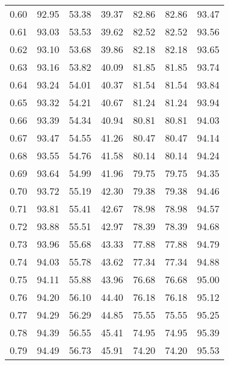 \begin{tabular}{|c|c|c|c|c|c|c|}
      0.60 &     92.95 &     53.38 &      39.37 &   82.86 &      82.86 &         93.47 \\
      0.61 &     93.03 &     53.53 &      39.62 &   82.52 &      82.52 &         93.56 \\
      0.62 &     93.10 &     53.68 &      39.86 &   82.18 &      82.18 &         93.65 \\
      0.63 &     93.16 &     53.82 &      40.09 &   81.85 &      81.85 &         93.74 \\
      0.64 &     93.24 &     54.01 &      40.37 &   81.54 &      81.54 &         93.84 \\
      0.65 &     93.32 &     54.21 &      40.67 &   81.24 &      81.24 &         93.94 \\
      0.66 &     93.39 &     54.34 &      40.94 &   80.81 &      80.81 &         94.03 \\
      0.67 &     93.47 &     54.55 &      41.26 &   80.47 &      80.47 &         94.14 \\
      0.68 &     93.55 &     54.76 &      41.58 &   80.14 &      80.14 &         94.24 \\
      0.69 &     93.64 &     54.99 &      41.96 &   79.75 &      79.75 &         94.35 \\
      0.70 &     93.72 &     55.19 &      42.30 &   79.38 &      79.38 &         94.46 \\
      0.71 &     93.81 &     55.41 &      42.67 &   78.98 &      78.98 &         94.57 \\
      0.72 &     93.88 &     55.51 &      42.97 &   78.39 &      78.39 &         94.68 \\
      0.73 &     93.96 &     55.68 &      43.33 &   77.88 &      77.88 &         94.79 \\
      0.74 &     94.03 &     55.78 &      43.62 &   77.34 &      77.34 &         94.88 \\
      0.75 &     94.11 &     55.88 &      43.96 &   76.68 &      76.68 &         95.00 \\
      0.76 &     94.20 &     56.10 &      44.40 &   76.18 &      76.18 &         95.12 \\
      0.77 &     94.29 &     56.29 &      44.85 &   75.55 &      75.55 &         95.25 \\
      0.78 &     94.39 &     56.55 &      45.41 &   74.95 &      74.95 &         95.39 \\
      0.79 &     94.49 &     56.73 &      45.91 &   74.20 &      74.20 &         95.53 \\

\end{tabular}
